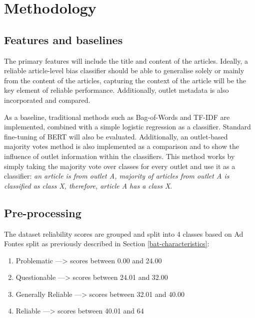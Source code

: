 \chapter{Methodology}
\label{cha:5}

\section{Features and baselines}

The primary features will include the title and content of the articles. Ideally, a reliable article-level bias classifier should be able to generalise solely or mainly from the content of the articles, capturing the context of the article will be the key element of reliable performance. Additionally, outlet metadata is also incorporated and compared.

As a baseline, traditional methods such as Bag-of-Words and TF-IDF are implemented, combined with a simple logistic regression as a classifier. Standard fine-tuning of BERT will also be evaluated. Additionally, an outlet-based majority votes method is also implemented as a comparison and to show the influence of outlet information within the classifiers. This method works by simply taking the majority vote over classes for every outlet and use it as a classifier: \textit{an article is from outlet A, majority of articles from outlet A is classified as class X, therefore, article A has a class X}.

\section{Pre-processing}

The dataset reliability scores are grouped and split into 4 classes based on Ad Fontes split as previously described in Section \ref{bat-characteristics}:
\begin{enumerate}
    \item Problematic ---> scores between 0.00 and 24.00
    \item Questionable ---> scores between 24.01 and 32.00
    \item Generally Reliable ---> scores between 32.01 and 40.00
    \item Reliable ---> scores between 40.01 and 64
\end{enumerate}

